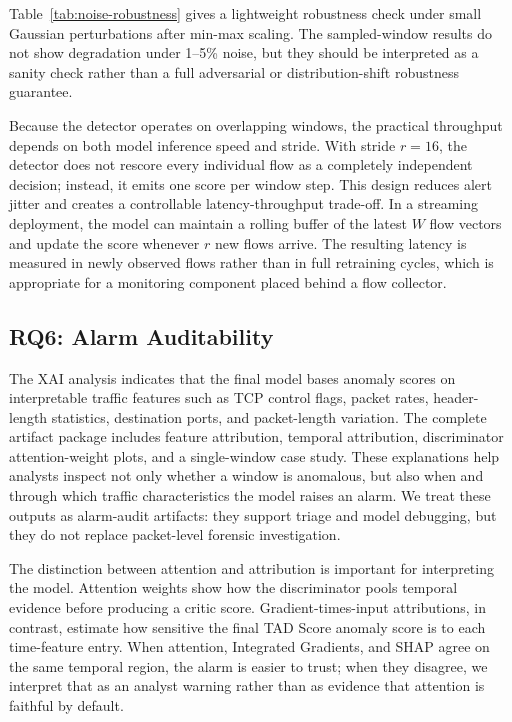 \documentclass[conference]{IEEEtran}
\newcommand{\tad}{TAD Score}
\begin{document}
Table~\ref{tab:noise-robustness} gives a lightweight robustness check under small Gaussian perturbations after min-max scaling. The sampled-window results do not show degradation under 1--5\% noise, but they should be interpreted as a sanity check rather than a full adversarial or distribution-shift robustness guarantee.

Because the detector operates on overlapping windows, the practical throughput depends on both model inference speed and stride. With stride $r=16$, the detector does not rescore every individual flow as a completely independent decision; instead, it emits one score per window step. This design reduces alert jitter and creates a controllable latency-throughput trade-off. In a streaming deployment, the model can maintain a rolling buffer of the latest $W$ flow vectors and update the score whenever $r$ new flows arrive. The resulting latency is measured in newly observed flows rather than in full retraining cycles, which is appropriate for a monitoring component placed behind a flow collector.

\subsection{RQ6: Alarm Auditability}
The XAI analysis indicates that the final model bases anomaly scores on interpretable traffic features such as TCP control flags, packet rates, header-length statistics, destination ports, and packet-length variation. The complete artifact package includes feature attribution, temporal attribution, discriminator attention-weight plots, and a single-window case study. These explanations help analysts inspect not only whether a window is anomalous, but also when and through which traffic characteristics the model raises an alarm. We treat these outputs as alarm-audit artifacts: they support triage and model debugging, but they do not replace packet-level forensic investigation.

The distinction between attention and attribution is important for interpreting the model. Attention weights show how the discriminator pools temporal evidence before producing a critic score. Gradient-times-input attributions, in contrast, estimate how sensitive the final \tad{} anomaly score is to each time-feature entry. When attention, Integrated Gradients, and SHAP agree on the same temporal region, the alarm is easier to trust; when they disagree, we interpret that as an analyst warning rather than as evidence that attention is faithful by default.
\end{document}
